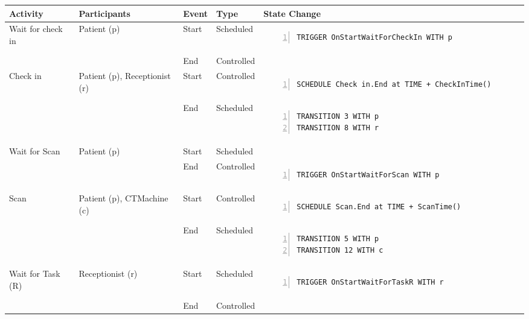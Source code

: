 \begin{tabular}{@{}>{\raggedright\arraybackslash}p{1.5cm}>{\raggedright\arraybackslash}p{2.1cm}>{\raggedright\arraybackslash}p{0.9cm}>{\raggedright\arraybackslash}p{2.2cm}>{\raggedright\arraybackslash}p{8cm}@{}}
  \toprule
  Activity          & Participants & Event & Type       & State Change \\ \midrule
  Wait for check in & Patient (p)  & Start & Scheduled  & 
  \vspace{-12pt}
  \begin{Verbatim}[numbers=left]
TRIGGER OnStartWaitForCheckIn WITH p
  \end{Verbatim}
  \\ \cmidrule{3-5}
                    &              & End   & Controlled &
  
  \\ \midrule
  Check in & Patient (p), Receptionist (r)  & Start & Controlled  & 
  \vspace{-12pt}
  \begin{Verbatim}[numbers=left]
SCHEDULE Check in.End at TIME + CheckInTime()
  \end{Verbatim}
  \\ \cmidrule{3-5}
                    &              & End   & Scheduled &
  \vspace{-12pt}
  \begin{Verbatim}[numbers=left]
TRANSITION 3 WITH p
TRANSITION 8 WITH r
  \end{Verbatim}          
  \\ \midrule
  Wait for Scan & Patient (p)  & Start & Scheduled  &              \\ \cmidrule{3-5}
                &              & End   & Controlled &
  \vspace{-12pt}
  \begin{Verbatim}[numbers=left]
TRIGGER OnStartWaitForScan WITH p
  \end{Verbatim}
  \\ \midrule
  Scan & Patient (p), CTMachine (c)  & Start & Controlled  & 
  \vspace{-12pt}
  \begin{Verbatim}[numbers=left]
SCHEDULE Scan.End at TIME + ScanTime()
  \end{Verbatim}
  \\ \cmidrule{3-5}
                    &              & End   & Scheduled &
  \vspace{-12pt}
  \begin{Verbatim}[numbers=left]
TRANSITION 5 WITH p
TRANSITION 12 WITH c
  \end{Verbatim}          
  \\ \midrule
  Wait for Task (R) & Receptionist (r)  & Start & Scheduled  &
  \vspace{-12pt}
  \begin{Verbatim}[numbers=left]
TRIGGER OnStartWaitForTaskR WITH r
  \end{Verbatim}
  \\ \cmidrule{3-5}
                    &              & End   & Controlled &
  

\end{tabular}

